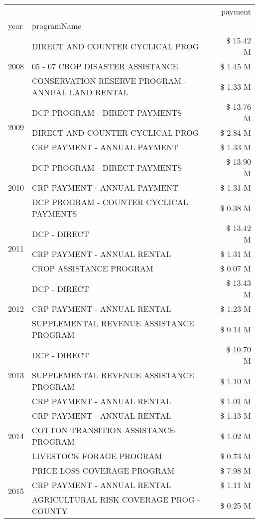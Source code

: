 \begin{tabular}{llr}
\toprule
 &  & payment \\
year & programName &  \\
\midrule
\multirow[t]{3}{*}{2008} & DIRECT AND COUNTER CYCLICAL PROG & \$ 15.42 M \\
 & 05 - 07 CROP DISASTER ASSISTANCE & \$ 1.45 M \\
 & CONSERVATION RESERVE PROGRAM - ANNUAL LAND RENTAL & \$ 1.33 M \\
\cline{1-3}
\multirow[t]{3}{*}{2009} & DCP PROGRAM - DIRECT PAYMENTS & \$ 13.76 M \\
 & DIRECT AND COUNTER CYCLICAL PROG & \$ 2.84 M \\
 & CRP PAYMENT - ANNUAL PAYMENT & \$ 1.33 M \\
\cline{1-3}
\multirow[t]{3}{*}{2010} & DCP PROGRAM - DIRECT PAYMENTS & \$ 13.90 M \\
 & CRP PAYMENT - ANNUAL PAYMENT & \$ 1.31 M \\
 & DCP PROGRAM - COUNTER CYCLICAL PAYMENTS & \$ 0.38 M \\
\cline{1-3}
\multirow[t]{3}{*}{2011} & DCP - DIRECT & \$ 13.42 M \\
 & CRP PAYMENT - ANNUAL RENTAL & \$ 1.31 M \\
 & CROP ASSISTANCE PROGRAM & \$ 0.07 M \\
\cline{1-3}
\multirow[t]{3}{*}{2012} & DCP - DIRECT & \$ 13.43 M \\
 & CRP PAYMENT - ANNUAL RENTAL & \$ 1.23 M \\
 & SUPPLEMENTAL REVENUE ASSISTANCE PROGRAM & \$ 0.14 M \\
\cline{1-3}
\multirow[t]{3}{*}{2013} & DCP - DIRECT & \$ 10.70 M \\
 & SUPPLEMENTAL REVENUE ASSISTANCE PROGRAM & \$ 1.10 M \\
 & CRP PAYMENT - ANNUAL RENTAL & \$ 1.01 M \\
\cline{1-3}
\multirow[t]{3}{*}{2014} & CRP PAYMENT - ANNUAL RENTAL & \$ 1.13 M \\
 & COTTON TRANSITION ASSISTANCE PROGRAM & \$ 1.02 M \\
 & LIVESTOCK FORAGE PROGRAM & \$ 0.73 M \\
\cline{1-3}
\multirow[t]{3}{*}{2015} & PRICE LOSS COVERAGE PROGRAM & \$ 7.98 M \\
 & CRP PAYMENT - ANNUAL RENTAL & \$ 1.11 M \\
 & AGRICULTURAL RISK COVERAGE PROG - COUNTY & \$ 0.25 M \\
\cline{1-3}

\end{tabular}
